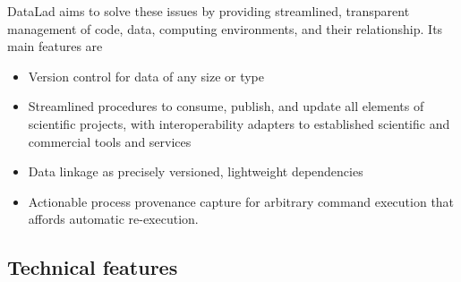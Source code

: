 {DataLad aims to solve these issues by providing streamlined, transparent management of code, data, computing environments, and their relationship.
Its main features are
\begin{itemize}
	\item Version control for data of any size or type
	\item Streamlined procedures to consume, publish, and update  all elements of scientific projects, with interoperability adapters to established scientific and commercial tools and services
	\item Data linkage as precisely versioned, lightweight dependencies
	\item Actionable process provenance capture for arbitrary command execution that affords automatic re-execution.
\end{itemize}

\subsection{Technical features}

}
